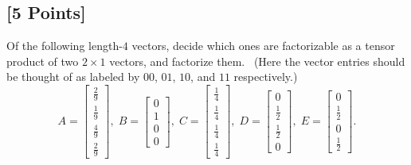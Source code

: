 \documentclass[11pt]{article}
\begin{document}
\subsection{[5 Points]} Of the following length-$4$ vectors, decide which ones are factorizable as a tensor product of two $2 \times 1$ vectors, and factorize them. \ (Here the vector entries
should be thought of as labeled by $00$, $01$, $10$, and $11$ respectively.)%
\[
A=
\begin{bmatrix}
	\frac{2}{9}\\[0.1em]
	\frac{1}{9}\\[0.1em]
	\frac{4}{9}\\[0.1em]
	\frac{2}{9}
\end{bmatrix}\!,\;
B=
\begin{bmatrix}
	0\\
	1\\
	0\\
	0
\end{bmatrix}\!,\;
C=
\begin{bmatrix}
	\frac{1}{4}\\[0.1em]
	\frac{1}{4}\\[0.1em]
	\frac{1}{4}\\[0.1em]
	\frac{1}{4}
\end{bmatrix}\!,\;
D=
\begin{bmatrix}
	0\\
	\frac{1}{2}\\[0.1em]
	\frac{1}{2}\\
	0
\end{bmatrix}\!,\;
E=
\begin{bmatrix}
	0\\
	\frac{1}{2}\\
	0\\
	\frac{1}{2}
\end{bmatrix}.
\]
\end{document}
